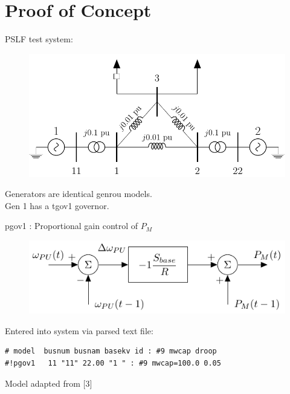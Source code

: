 \documentclass[14pt, unknownkeysallowed]{beamer}
\begin{document}
\section{Proof of Concept}
\begin{frame}
PSLF test system:
\vspace{-1em}\\
\begin{figure}
	\includegraphics[width=\linewidth]{cicuitEE554}
\end{figure}
\vspace{-1em}
Generators are identical genrou models. \\Gen 1 has a tgov1 governor.
\end{frame}

\begin{frame}[fragile]
pgov1 : Proportional gain control of $P_M$ \\
\begin{figure}
	\includegraphics[width=\linewidth]{pgov1}
\end{figure}\vspace{-1em}
Entered into system via parsed text file:
\begin{lstlisting}[frame=single, basicstyle=\footnotesize]
# model  busnum busnam basekv id : #9 mwcap droop
#!pgov1   11 "11" 22.00 "1 " : #9 mwcap=100.0 0.05
\end{lstlisting}\vspace{-0.5em}
\footnotesize Model adapted from [3]
\end{frame}
\end{document}
